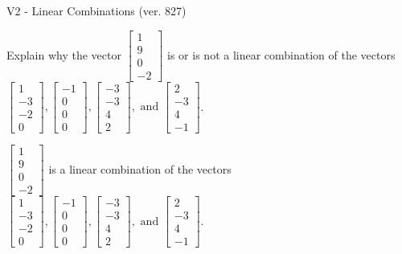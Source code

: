 \begin{exercise}
  \begin{exerciseTitle}V2 - Linear Combinations (ver. 827)\end{exerciseTitle}
  \begin{exerciseStatement}
    Explain why the vector \(\left[\begin{array}{c}
1 \\
9 \\
0 \\
-2
\end{array}\right]\)  is or is not a linear 
	combination of the vectors \(\left[\begin{array}{c}
1 \\
-3 \\
-2 \\
0
\end{array}\right] , \left[\begin{array}{c}
-1 \\
0 \\
0 \\
0
\end{array}\right] , \left[\begin{array}{c}
-3 \\
-3 \\
4 \\
2
\end{array}\right] , \text{ and } \left[\begin{array}{c}
2 \\
-3 \\
4 \\
-1
\end{array}\right]\).
	


  \end{exerciseStatement}
  \begin{exerciseAnswer}
   \(\left[\begin{array}{c}
1 \\
9 \\
0 \\
-2
\end{array}\right]\) 
  	 is  
	a linear combination of the vectors \(\left[\begin{array}{c}
1 \\
-3 \\
-2 \\
0
\end{array}\right] , \left[\begin{array}{c}
-1 \\
0 \\
0 \\
0
\end{array}\right] , \left[\begin{array}{c}
-3 \\
-3 \\
4 \\
2
\end{array}\right] , \text{ and } \left[\begin{array}{c}
2 \\
-3 \\
4 \\
-1
\end{array}\right]\).


\end{exerciseAnswer}
\end{exercise}
